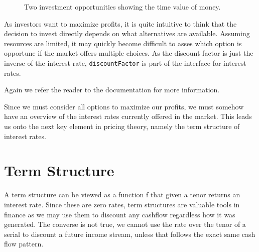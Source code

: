 \begin{figure}[h!]
\begin{center}
\begin{tikzpicture}[-,shorten >=1pt,auto,node distance=1.5cm,thick,minimum size=0.8cm,main node/.style={circle,draw=red,very thick}]



\end{tikzpicture}
\caption{Two investment opportunities showing the time value of money.}
\label{fig:tvom}
\end{center}
\end{figure}

As investors want to maximize profits, it is quite intuitive to think that
the decision to invest directly depends on what alternatives are available.
Assuming resources are limited, it may quickly become difficult to asses which
option is opportune if the market offers multiple choices. As the discount factor
is just the inverse of the interest rate, \texttt{discountFactor} is part of the
interface for interest rates. 

Again we refer the reader to the \hql documentation\cite{hqldoc} for more information.

Since we must consider all options to maximize our profits, we must somehow have an
overview of the interest rates currently offered in the market. This leads us onto the
next key element in pricing theory, namely the term structure of interest rates.

\section{Term Structure}

A term structure can be viewed as a function f that given a tenor returns 
an interest rate. Since these are zero rates, term structures are valuable 
tools in finance as we may use them to discount any cashflow regardless how it
was generated. The converse is not true, we cannot use the rate over the tenor
of a serial to discount a future income stream, unless that follows the exact
same cash flow pattern.\\

